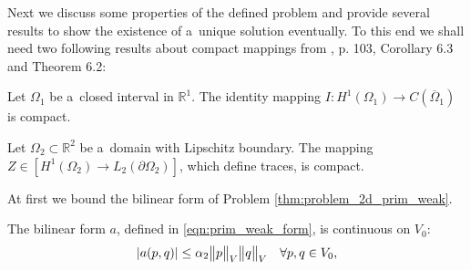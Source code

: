 Next we discuss some properties of the defined problem and provide several results
to show the existence of a~unique solution eventually.
To this end we shall need two following results about compact mappings from \cite{necas_direct_2012}, p. 103, Corollary 6.3 and Theorem 6.2:
\begin{lemma} \label{lem:compact_1}
    Let $\Omega_1$ be a~closed interval in $\mathbb R^1$.
    The identity mapping $I:H^1(\Omega_1)\rightarrow C(\overbar\Omega_1)$ is compact.
\end{lemma}

\begin{lemma} \label{lem:compact_2}
    Let $\Omega_2 \subset \mathbb R^2$ be a~domain with Lipschitz boundary.
    The mapping $Z\in[H^1(\Omega_2)\rightarrow L_2(\partial\Omega_2)]$, which define traces, is compact.
\end{lemma}

\vspace{10pt}
At first we bound the bilinear form of Problem \ref{thm:problem_2d_prim_weak}.
\begin{lemma} \label{lem:prim_form_a_continuous}
    The bilinear form $a$, defined in \eqref{eqn:prim_weak_form}, is continuous on $V_0$:
    \begin{equation} \label{eqn:prim_form_a_bound}
        \left|a(p,q)\right| \leq \alpha_2 \bigl\Vert p\bigr\Vert_V \bigl\Vert q\bigr\Vert_V \quad \forall p,q\in V_0,
    \end{equation}
\end{lemma}

